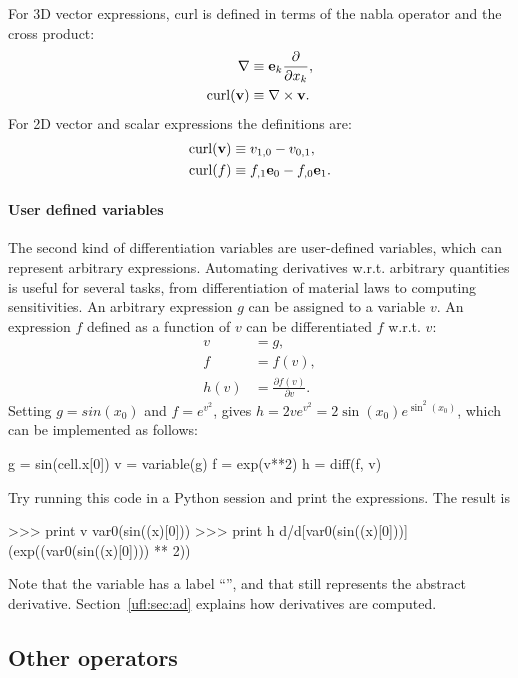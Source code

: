 For 3D vector expressions, curl is defined in terms of the nabla operator
and the cross product:
\begin{align}
  \nabla &\equiv \mathbf{e}_k \frac{\partial}{\partial x_k}, \\
  \operatorname{curl}(\mathbf{v}) &\equiv \nabla \times \mathbf{v}.
\end{align}
For 2D vector and scalar expressions the definitions are:
\begin{align}
  \operatorname{curl}(\mathbf{v}) &\equiv v_{1,0} - v_{0,1}, \\
  \operatorname{curl}(f)   &\equiv f_{,1}\mathbf{e}_0 - f_{,0}\mathbf{e}_1.
\end{align}

\paragraph{User defined variables}
\label{ufl:sec:diff}

The second kind of differentiation variables are user-defined
variables, which can represent arbitrary expressions.  Automating
derivatives w.r.t. arbitrary quantities is useful for several tasks, from
differentiation of material laws to computing sensitivities.  An arbitrary
expression $g$ can be assigned to a variable $v$.  An expression $f$
defined as a function of $v$ can be differentiated $f$ w.r.t. $v$:
\begin{align}
v &= g, \\
f &= f(v), \\
h(v) &= \frac{\partial f(v)}{\partial v}.
\end{align}
Setting $g = sin(x_0)$ and $f = e^{v^2}$, gives $h = 2 v e^{v^2} =
2 \sin(x_0) e^{\sin^2(x_0)}$, which can be implemented as follows:
\begin{python}
g = sin(cell.x[0])
v = variable(g)
f = exp(v**2)
h = diff(f, v)
\end{python}
Try running this code in a Python session and print the expressions.
The result is
\begin{python}
>>> print v
var0(sin((x)[0]))
>>> print h
d/d[var0(sin((x)[0]))] (exp((var0(sin((x)[0]))) ** 2))
\end{python}
Note that the variable has a label ``'', and that 
still represents the abstract derivative.  Section~\ref{ufl:sec:ad}
explains how derivatives are computed.

\subsection{Other operators}
\label{ufl:sec:conditionals}

